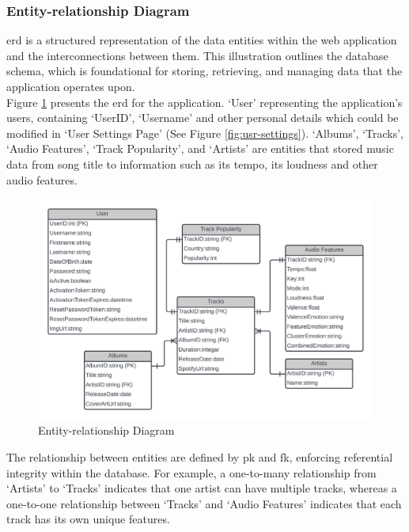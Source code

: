 \subsubsection{Entity-relationship Diagram}
\gls{erd} is a structured representation of the data entities within the web application and the interconnections between them. 
This illustration outlines the database schema, which is foundational for storing, retrieving, and managing data that the application operates upon.
\\
\indent Figure \ref{fig:erd} presents the \gls{erd} for the application.
`User' representing the application's users, containing `UserID', `Username' and other personal details which could be modified in `User Settings Page' (See Figure \ref{fig:usr-settings}).
`Albums', `Tracks', `Audio Features', `Track Popularity', and `Artists' are entities that stored music data from song title to information such as its tempo, its loudness and other audio features.
\begin{figure}[H]
    \centering
    \includegraphics[width=16cm]{Images/erd.png}
    \caption{Entity-relationship Diagram}
    \label{fig:erd}
\end{figure}
\indent The relationship between entities are defined by \gls{pk} and \gls{fk}, enforcing referential integrity within the database.
For example, a one-to-many relationship from `Artists' to `Tracks' indicates that one artist can have multiple tracks, whereas a one-to-one relationship between `Tracks' and `Audio Features' indicates that each track has its own unique features.
